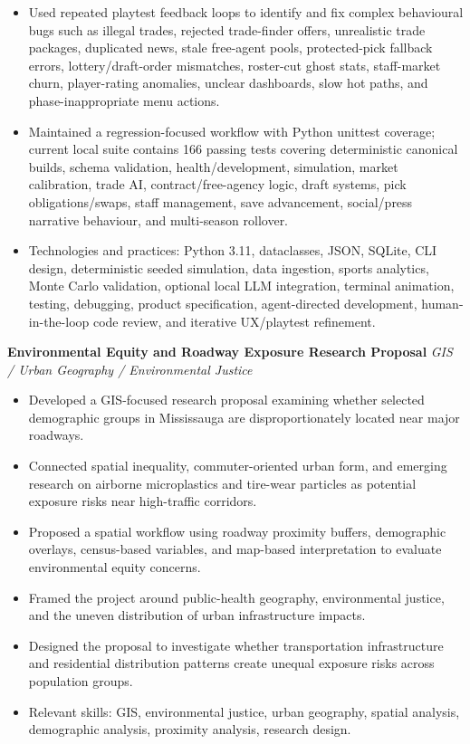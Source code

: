 \documentclass[10.5pt,letterpaper]{article}
\begin{document}
\begin{itemize}
\item Used repeated playtest feedback loops to identify and fix complex behavioural bugs such as illegal trades, rejected trade-finder offers, unrealistic trade packages, duplicated news, stale free-agent pools, protected-pick fallback errors, lottery/draft-order mismatches, roster-cut ghost stats, staff-market churn, player-rating anomalies, unclear dashboards, slow hot paths, and phase-inappropriate menu actions.
\item Maintained a regression-focused workflow with Python unittest coverage; current local suite contains 166 passing tests covering deterministic canonical builds, schema validation, health/development, simulation, market calibration, trade AI, contract/free-agency logic, draft systems, pick obligations/swaps, staff management, save advancement, social/press narrative behaviour, and multi-season rollover.
\item Technologies and practices: Python 3.11, dataclasses, JSON, SQLite, CLI design, deterministic seeded simulation, data ingestion, sports analytics, Monte Carlo validation, optional local LLM integration, terminal animation, testing, debugging, product specification, agent-directed development, human-in-the-loop code review, and iterative UX/playtest refinement.
\end{itemize}
\textbf{Environmental Equity and Roadway Exposure Research Proposal} \hfill \textit{GIS / Urban Geography / Environmental Justice}\par
\begin{itemize}
\item Developed a GIS-focused research proposal examining whether selected demographic groups in Mississauga are disproportionately located near major roadways.
\item Connected spatial inequality, commuter-oriented urban form, and emerging research on airborne microplastics and tire-wear particles as potential exposure risks near high-traffic corridors.
\item Proposed a spatial workflow using roadway proximity buffers, demographic overlays, census-based variables, and map-based interpretation to evaluate environmental equity concerns.
\item Framed the project around public-health geography, environmental justice, and the uneven distribution of urban infrastructure impacts.
\item Designed the proposal to investigate whether transportation infrastructure and residential distribution patterns create unequal exposure risks across population groups.
\item Relevant skills: GIS, environmental justice, urban geography, spatial analysis, demographic analysis, proximity analysis, research design.
\end{itemize}
\end{document}
